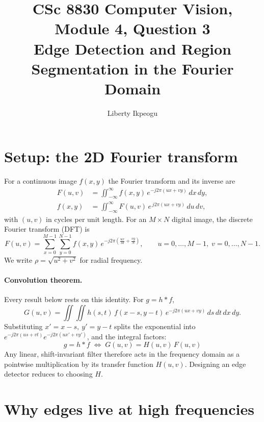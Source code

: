 \documentclass[11pt]{article}
\title{CSc 8830 Computer Vision, Module 4, Question 3\\[4pt]
\large Edge Detection and Region Segmentation in the Fourier Domain}
\author{Liberty Ikpeogu}
\date{}
\begin{document}
\maketitle

\section{Setup: the 2D Fourier transform}

For a continuous image $f(x,y)$ the Fourier transform and its inverse are
\begin{align}
F(u,v) &= \iint_{-\infty}^{\infty} f(x,y)\, e^{-j2\pi(ux+vy)}\,dx\,dy, \label{eq:ft}\\
f(x,y) &= \iint_{-\infty}^{\infty} F(u,v)\, e^{\,j2\pi(ux+vy)}\,du\,dv, \label{eq:ift}
\end{align}
with $(u,v)$ in cycles per unit length. For an $M\times N$ digital image, the discrete Fourier transform (DFT) is
\begin{equation}
F(u,v)=\sum_{x=0}^{M-1}\sum_{y=0}^{N-1} f(x,y)\,e^{-j2\pi\left(\frac{ux}{M}+\frac{vy}{N}\right)},
\qquad u=0,\dots,M-1,\; v=0,\dots,N-1 .
\end{equation}
We write $\rho=\sqrt{u^2+v^2}$ for radial frequency.

\paragraph{Convolution theorem.} Every result below rests on this identity. For $g=h*f$,
\[
G(u,v)=\iint\!\!\iint h(s,t)\,f(x-s,y-t)\,e^{-j2\pi(ux+vy)}\,ds\,dt\,dx\,dy .
\]
Substituting $x'=x-s,\ y'=y-t$ splits the exponential into $e^{-j2\pi(us+vt)}e^{-j2\pi(ux'+vy')}$, and the integral factors:
\begin{equation}
\boxed{\,g=h*f \;\Longleftrightarrow\; G(u,v)=H(u,v)\,F(u,v)\,} \label{eq:conv}
\end{equation}
Any linear, shift-invariant filter therefore acts in the frequency domain as a pointwise multiplication by its transfer function $H(u,v)$. Designing an edge detector reduces to choosing $H$.

\section{Why edges live at high frequencies}
\end{document}
